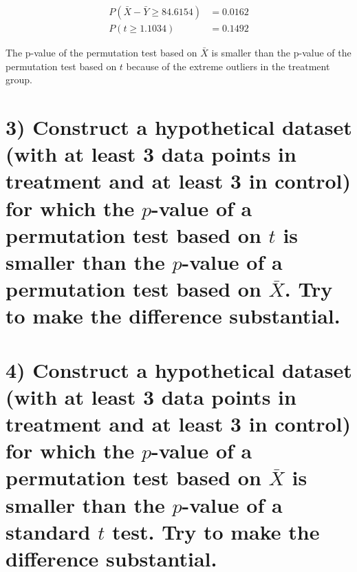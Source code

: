 \documentclass[11pt]{article}
\newcommand{\pr}{P} %
\begin{document}
\begin{align*}
\pr(\bar{X} - \bar{Y} \geq 84.6154) &= 0.0162 \\
\pr(t \geq 1.1034) &= 0.1492
\end{align*}

The p-value of the permutation test based on $\bar{X}$ is smaller than the p-value of the permutation test based on $t$ because of the extreme outliers in the treatment group.

\section*{3) Construct a hypothetical dataset (with at least 3 data points in treatment and at least 3 in control) for which the $p$-value of a permutation test based on $t$ is smaller than the $p$-value of a permutation test based on $\bar{X}$. Try to make the difference substantial.}


\section*{4) Construct a hypothetical dataset (with at least 3 data points in treatment and at least 3 in control) for which the $p$-value of a permutation test based on $\bar{X}$ is smaller than the $p$-value of a standard $t$ test. Try to make the difference substantial.}
\end{document}
